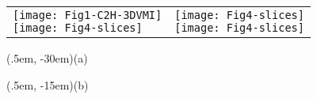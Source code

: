 \documentclass[varwidth=20em]{standalone}
\begin{document}
\begin{tabular}[c]{p{23em}p{50em}}
\shortstack[c]{
 \texttt{[image: Fig1-C2H-3DVMI]} \\[0.3cm]
\texttt{[image: Fig4-slices]}}
& 
\shortstack[c]{
\texttt{[image: Fig4-slices]}\\[0.3cm]
\texttt{[image: Fig4-slices]}
}
\end{tabular}
\begin{textblock*}{5em}(.5em, -30em)\sf (a)\end{textblock*}
\begin{textblock*}{5em}(.5em, -15em)\sf (b)\end{textblock*}
\end{document}
